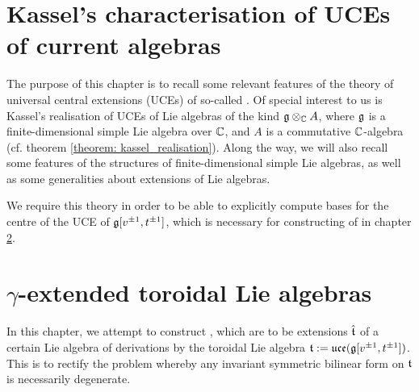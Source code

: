     \chapter{Kassel's characterisation of UCEs of current algebras} \label{chapter: kassel_UCEs}
        \begin{summary}
            The purpose of this chapter is to recall some relevant features of the theory of universal central extensions (UCEs) of so-called . Of special interest to us is Kassel's realisation of UCEs of Lie algebras of the kind $\g \tensor_{\bbC} A$, where $\mathfrak{g}$ is a finite-dimensional simple Lie algebra over $\mathbb{C}$, and $A$ is a commutative $\mathbb{C}$-algebra (cf. theorem \ref{theorem: kassel_realisation}). Along the way, we will also recall some features of the structures of finite-dimensional simple Lie algebras, as well as some generalities about extensions of Lie algebras.
            
            We require this theory in order to be able to explicitly compute bases for the centre of the UCE of $\mathfrak{g}[v^{\pm 1}, t^{\pm 1}]$, which is necessary for constructing of  in chapter \ref{chapter: yangian_EALAs}. 
        \end{summary}

        \minitoc

        \newpage
    
        
        
        \newpage
        
        
        
        \newpage
        
        

    \newpage

    \chapter{\texorpdfstring{$\gamma$}{}-extended toroidal Lie algebras} \label{chapter: yangian_EALAs}
        \begin{summary}
            In this chapter, we attempt to construct , which are to be extensions $\hat{\mathfrak{t}}$ of a certain Lie algebra of derivations by the toroidal Lie algebra $\mathfrak{t} := \mathfrak{uce}(\mathfrak{g}[v^{\pm 1}, t^{\pm 1}])$. This is to rectify the problem whereby any invariant symmetric bilinear form on $\mathfrak{t}$ is necessarily degenerate.
        \end{summary}

